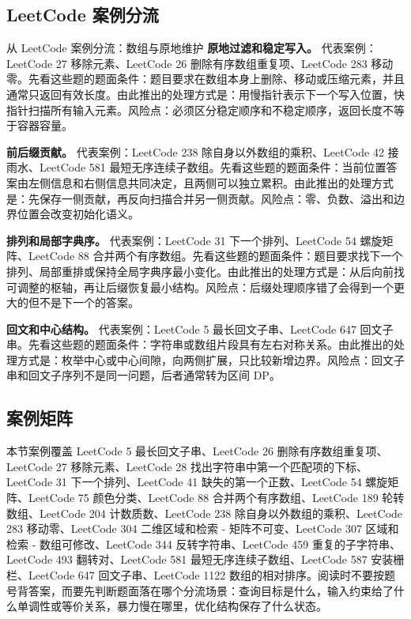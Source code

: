\subsection{LeetCode 案例分流}

\begin{principlebox}{从 LeetCode 案例分流：数组与原地维护}
\textbf{原地过滤和稳定写入。}
代表案例：LeetCode 27 移除元素、LeetCode 26 删除有序数组重复项、LeetCode 283 移动零。先看这些题的题面条件：题目要求在数组本身上删除、移动或压缩元素，并且通常只返回有效长度。由此推出的处理方式是：用慢指针表示下一个写入位置，快指针扫描所有输入元素。风险点：必须区分稳定顺序和不稳定顺序，返回长度不等于容器容量。

\textbf{前后缀贡献。}
代表案例：LeetCode 238 除自身以外数组的乘积、LeetCode 42 接雨水、LeetCode 581 最短无序连续子数组。先看这些题的题面条件：当前位置答案由左侧信息和右侧信息共同决定，且两侧可以独立累积。由此推出的处理方式是：先保存一侧贡献，再反向扫描合并另一侧贡献。风险点：零、负数、溢出和边界位置会改变初始化语义。

\textbf{排列和局部字典序。}
代表案例：LeetCode 31 下一个排列、LeetCode 54 螺旋矩阵、LeetCode 88 合并两个有序数组。先看这些题的题面条件：题目要求找下一个排列、局部重排或保持全局字典序最小变化。由此推出的处理方式是：从后向前找可调整的枢轴，再让后缀恢复最小结构。风险点：后缀处理顺序错了会得到一个更大的但不是下一个的答案。

\textbf{回文和中心结构。}
代表案例：LeetCode 5 最长回文子串、LeetCode 647 回文子串。先看这些题的题面条件：字符串或数组片段具有左右对称关系。由此推出的处理方式是：枚举中心或中心间隙，向两侧扩展，只比较新增边界。风险点：回文子串和回文子序列不是同一问题，后者通常转为区间 DP。

\end{principlebox}

\subsection{案例矩阵}

本节案例覆盖 LeetCode 5 最长回文子串、LeetCode 26 删除有序数组重复项、LeetCode 27 移除元素、LeetCode 28 找出字符串中第一个匹配项的下标、LeetCode 31 下一个排列、LeetCode 41 缺失的第一个正数、LeetCode 54 螺旋矩阵、LeetCode 75 颜色分类、LeetCode 88 合并两个有序数组、LeetCode 189 轮转数组、LeetCode 204 计数质数、LeetCode 238 除自身以外数组的乘积、LeetCode 283 移动零、LeetCode 304 二维区域和检索 - 矩阵不可变、LeetCode 307 区域和检索 - 数组可修改、LeetCode 344 反转字符串、LeetCode 459 重复的子字符串、LeetCode 493 翻转对、LeetCode 581 最短无序连续子数组、LeetCode 587 安装栅栏、LeetCode 647 回文子串、LeetCode 1122 数组的相对排序。阅读时不要按题号背答案，而要先判断题面落在哪个分流场景：查询目标是什么，输入约束给了什么单调性或等价关系，暴力慢在哪里，优化结构保存了什么状态。

